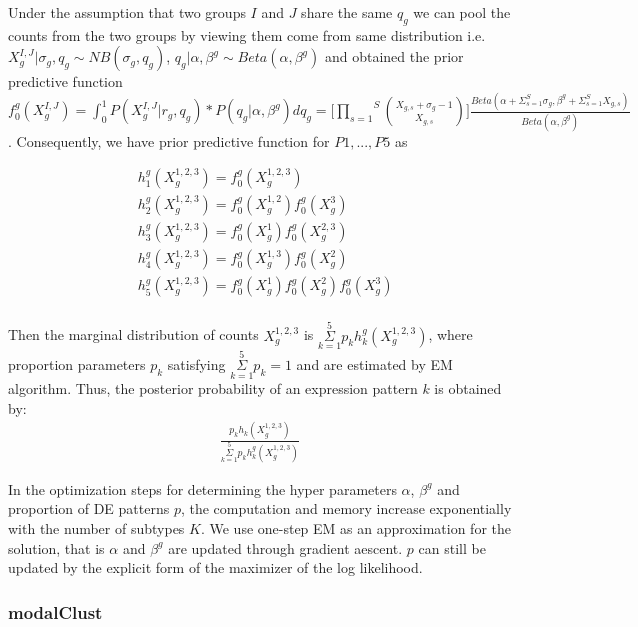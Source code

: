 \documentclass[aoas,preprint]{imsart}
\begin{document}
Under the assumption that two groups $I$ and $J$ share the same $q_g$ we can pool the counts from the two groups by viewing them come from same distribution i.e. $X_g^{I, J} | \sigma_{g}, q_g \sim NB(\sigma_{g}, q_g)$, $q_g | \alpha, \beta^{g} \sim Beta(\alpha, \beta^{g})$ and obtained the prior predictive function $f_0^{g}(X_g^{I,J}) = \int_0 ^1 P(X_g^{I,J} | r_{g}, q_g) * P(q_g | \alpha, \beta^{g}) dq_g = \Big[ \overset{S}{\underset{s = 1}{\prod}} {X_{g,s} + \sigma_{g} - 1 \choose X_{g,s}} \Big] \frac{Beta(\alpha + \Sigma_{s = 1}^S \sigma_{g}, \beta^{g} + \Sigma_{s = 1}^S X_{g,s})}{Beta(\alpha, \beta^{g})}$.  Consequently, we have prior predictive function for $P1, ..., P5$ as


\begin{align*}
&h_1^{g}(X_g^{1,2,3}) = f_0^{g}(X_g^{1,2,3})\\
&h_2^{g}(X_g^{1,2,3}) = f_0^{g}(X_g^{1,2})f_0^{g}(X_g^3)\\
&h_3^{g}(X_g^{1,2,3}) = f_0^{g}(X_g^1)f_0^{g}(X_g^{2,3})\\
&h_4^{g}(X_g^{1,2,3}) = f_0^{g}(X_g^{1,3})f_0^{g}(X_g^2)\\
&h_5^{g}(X_g^{1,2,3}) = f_0^{g}(X_g^1)f_0^{g}(X_g^2)f_0^{g}(X_g^3)\\
\end{align*}


Then the marginal distribution of counts $X_g^{1,2,3}$ is $\overset{5}{\underset{k = 1}{\Sigma}} p_k h_k^{g}(X_g^{1,2,3})$, where proportion parameters $p_k$ satisfying $\overset{5}{\underset{k = 1}{\Sigma}} p_k = 1$ and are estimated by EM algorithm. Thus, the posterior probability of an expression pattern $k$ is obtained by:
\begin{eqnarray*}
\frac{p_k h_k(X_g^{1,2,3})}{\overset{5}{\underset{k = 1}{\Sigma}} p_k h_k^{g}(X_g^{1,2,3})}
\end{eqnarray*}


In the optimization steps for determining the hyper parameters $\alpha$, $\beta^g$ and proportion of DE patterns $p$, the computation and memory increase exponentially with the number of subtypes $K$. We use one-step EM as an approximation for the solution, that is $\alpha$ and $\beta^g$ are updated through gradient aescent. $p$ can still be updated by the explicit form of the maximizer of the log likelihood.


\subsubsection{modalClust}
\end{document}
